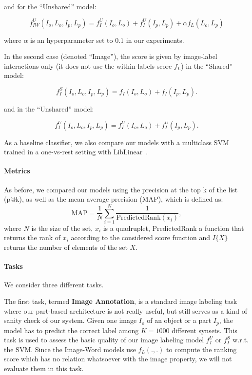 and for the ``Unshared'' model:

\[
f_{IW}^U(I_o,L_o,I_p,L_p) = f_I^U(I_o,L_o) + f_I^U(I_p,L_p) + \alpha f_{L}(L_o,L_p)
\]


where $\alpha$ is an hyperparameter set to $0.1$ in our experiments.


In the second case (denoted ``Image''), the score is given by image-label interactions only
(it does not use the within-labels score $f_L$) in the ``Shared'' model:

\[
f_I^S(I_o,L_o,I_p,L_p) = f_I(I_o,L_o) + f_I(I_p,L_p) .
\]

and in the ``Unshared'' model:

\[
f_I^U(I_o,L_o,I_p,L_p) = f_I^U(I_o,L_o) + f_I^U(I_p,L_p) .
\]

As a baseline classifier, we also compare our models with a multiclass SVM
trained in a one-vs-rest setting with LibLinear~\citep{liblinear}.




\paragraph{Metrics}

As before, we compared our models using the precision at the top k of the list
(p@k), as well as the mean average precision (MAP), which is defined as:
\[
  \textrm{MAP} = \frac{1}{N} \sum_{i=1}^{N} \dfrac{1}{\textrm{PredictedRank}(x_i)},
\]
where $N$ is the size of the set, $x_i$ is a quadruplet, PredictedRank
a function that returns the rank of $x_i$ according to the considered
score function and $I\{X\}$ returns the number of elements of the set $X$.

\paragraph{Tasks}%
We consider three different tasks.

The first task, termed {\bf Image Annotation}, is a standard image labeling
task where our part-based architecture is not really useful, but still serves
as a kind of sanity check of our system. Given one image $I_o$ of an object or
a part $I_p$, the model has to predict the correct label among $K=1000$
different synsets.
%
This task is used to assess the basic quality of our image labeling model
$f_I^U$ or $f_I^S$ w.r.t. the SVM.  Since the Image-Word models use $f_L(.,.)$
to compute the ranking score which has no relation whatsoever with the image
property, we will not evaluate them in this task.

